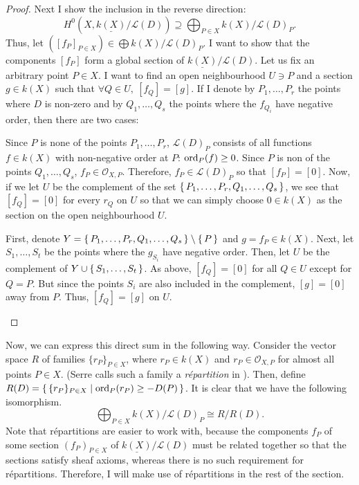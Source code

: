 \begin{proof}
  Next I show the inclusion in the reverse direction:
  \[
    H^{0}(X,\underline{k(X)}/\mathcal{L}(D))\supseteq\bigoplus_{P\in X}
    k(X)/\mathcal{L}(D)_{P}.
  \]
  Thus, let $([f_{P}]_{P\in X})\in\displaystyle\bigoplus
  k(X)/\mathcal{L}(D)_{P}$. I want to show that the components $[f_{P}]$
  form a global section of $\underline{k(X)}/\mathcal{L}(D)$. Let us
  fix an arbitrary point $P\in X$. I want to find an open neighbourhood
  $U\ni P$ and a section $g\in k(X)$ such that $\forall Q\in U,\ [f_{Q}]=[g]$.
  If I denote by $P_{1},\ldots,P_{r}$ the points where $D$ is non-zero
  and by $Q_{1},\ldots,Q_{s}$ the points where the $f_{Q_{i}}$ have negative
  order, then there are two cases:
  \begin{description}[style=nextline]
    \item[$P\not\in\set{P_{1},\ldots,P_{r},Q_{1},\ldots,Q_{s}}\big)$]
          Since $P$ is none of the points $P_{1},\ldots,P_{r}$,
          $\mathcal{L}(D)_{P}$ consists of all functions $f\in k(X)$
          with non-negative order at $P$: $\operatorname{ord}_{P}(f)\geq 0$.
          Since $P$ is non of the points $Q_{1},\ldots,Q_{s}$,
          $f_{P}\in\mathscr{O}_{X,P}$. Therefore, $f_{P}\in\mathcal{L}(D)_{P}$
          so that $[f_{P}]=[0]$. Now, if we let $U$ be the complement of
          the set $\set{P_{1},\ldots,P_{r},Q_{1},\ldots,Q_{s}}$, we see
          that $[f_{Q}]=[0]$ for every $r_{Q}$ on $U$ so that we can simply
          choose $0\in k(X)$ as the section on the open neighbourhood $U$.
    \item[$P\in\set{P_{1},\ldots,P_{r},Q_{1},\ldots,Q_{s}}\big)$]
          First, denote $Y=\set{P_{1},\ldots,P_{r},Q_{1},\ldots,Q_{s}}
          \setminus \set{P}$ and $g=f_{P}\in k(X)$. Next, let
          $S_{1},\ldots,S_{t}$ be the points where the $g_{S_{i}}$ have
          negative order. Then, let $U$ be the complement of
          $Y\cup \set{S_{1},\ldots,S_{t}}$. As above, $[f_{Q}]=[0]$ for all
          $Q\in U$ except for $Q=P$. But since the points $S_{i}$ are also
          included in the complement, $[g]=[0]$ away from $P$. Thus,
          $[f_{Q}]=[g]$ on $U$.
  \end{description}
\end{proof}
Now, we can express this direct sum in the following way. Consider the
vector space $R$ of families $\{r_{P}\}_{P\in X}$, where $r_{P}\in k(X)$ and
$r_{P}\in\mathscr{O}_{X,P}$ for almost all points $P\in X$.
(Serre calls such a family a \emph{r\'epartition} in \cite{serre}).
Then, define $R(D)=\set{\{r_{P}\}_{P\in X}\mid \operatorname{ord}_{P}(r_{P})\geq -D(P)}$.
It is clear that we have the following isomorphism.
\[
  \bigoplus_{P\in X}k(X)/\mathcal{L}(D)_{P}\cong R/R(D).
\]
Note that r\'epartitions are easier to work with, because the components
$f_{P}$ of some section $(f_{P})_{P\in X}$ of
$\underline{k(X)}/\mathcal{L}(D)$ must be related together so that the
sections satisfy sheaf axioms, whereas there is no such requirement for
r\'epartitions. Therefore, I will make use of r\'epartitions in the rest
of the section.


